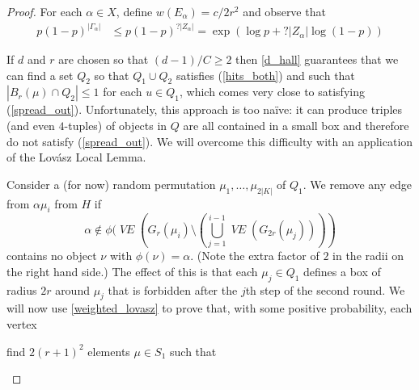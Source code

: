 \documentclass{patmorin}
\DeclareMathOperator{\VE}{\mathit{VE}}
\begin{document}
\begin{proof}
  For each $\alpha\in X$, define $w(E_\alpha)=c/2r^2$ and observe that
  \begin{align*}
    p(1-p)^{|\Gamma_\alpha|}
    & \le  p(1-p)^{?|Z_\alpha|} = \exp(\log p + ?|Z_\alpha|\log(1-p))
  \end{align*}


  If $d$ and $r$ are chosen so that $(d-1)/C\ge 2$ then \cref{d_hall} guarantees that we can find a set $Q_2$ so that $Q_1\cup Q_2$ satisfies (\ref{hits_both}) and such that $|B_r(\mu)\cap Q_2|\le 1$ for each $u\in Q_1$, which comes very close to satisfying (\ref{spread_out}).  Unfortunately, this approach is too naïve: it can produce triples (and even $4$-tuples) of objects in $Q$ are all contained in a small box and therefore do not satisfy (\ref{spread_out}).  We will overcome this difficulty with an application of the Lovász Local Lemma.

  Consider a (for now) random permutation $\mu_1,\ldots,\mu_{2|K|}$ of $Q_1$.  We remove any edge from $\alpha\mu_i$ from $H$ if
  \[
    \alpha\not\in \phi(\VE(G_r(\mu_i)\setminus(\bigcup_{j=1}^{i-1}\VE(G_{2r}(\mu_j))))
  \]
  contains no object $\nu$ with $\phi(\nu)=\alpha$.  (Note the extra factor of $2$ in the radii on the right hand side.)
  The effect of this is that each $\mu_j\in Q_1$ defines a box of radius $2r$ around $\mu_j$ that is forbidden after the $j$th step of the second round.  We will now use \cref{weighted_lovasz} to prove that, with some positive probability, each vertex


  find $2(r+1)^2$ elements $\mu\in S_1$ such that
  \begin{compactenum}[(a)]
    \item
  \end{compactenum}
\end{proof}



\newpage
\end{document}
